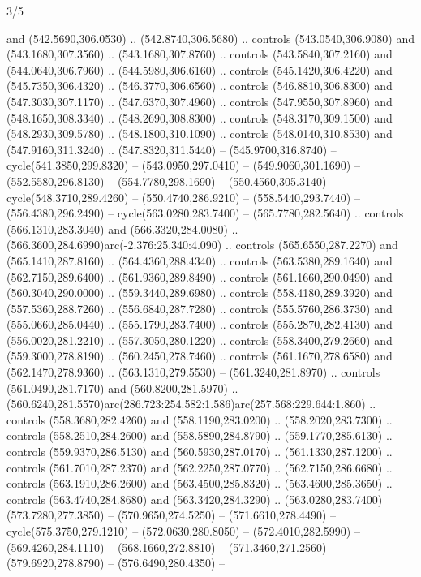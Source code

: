 \begin{flagdescription}{3/5}
\begin{scope}[xshift=0.5\flaglength,yshift=0.5\flagwidth,scale=\flagwidth/602.3]
\begin{scope}[y=0.8pt, x=0.8pt, yscale=-1, shift={(-600,-330)}]
  and (542.5690,306.0530) .. (542.8740,306.5680) .. controls (543.0540,306.9080)
  and (543.1680,307.3560) .. (543.1680,307.8760) .. controls (543.5840,307.2160)
  and (544.0640,306.7960) .. (544.5980,306.6160) .. controls (545.1420,306.4220)
  and (545.7350,306.4320) .. (546.3770,306.6560) .. controls (546.8810,306.8300)
  and (547.3030,307.1170) .. (547.6370,307.4960) .. controls (547.9550,307.8960)
  and (548.1650,308.3340) .. (548.2690,308.8300) .. controls (548.3170,309.1500)
  and (548.2930,309.5780) .. (548.1800,310.1090) .. controls (548.0140,310.8530)
  and (547.9160,311.3240) .. (547.8320,311.5440) -- (545.9700,316.8740) --
  cycle(541.3850,299.8320) -- (543.0950,297.0410) -- (549.9060,301.1690) --
  (552.5580,296.8130) -- (554.7780,298.1690) -- (550.4560,305.3140) --
  cycle(548.3710,289.4260) -- (550.4740,286.9210) -- (558.5440,293.7440) --
  (556.4380,296.2490) -- cycle(563.0280,283.7400) -- (565.7780,282.5640) ..
  controls (566.1310,283.3040) and (566.3320,284.0080) ..
  (566.3600,284.6990)arc(-2.376:25.340:4.090) .. controls (565.6550,287.2270)
  and (565.1410,287.8160) .. (564.4360,288.4340) .. controls (563.5380,289.1640)
  and (562.7150,289.6400) .. (561.9360,289.8490) .. controls (561.1660,290.0490)
  and (560.3040,290.0000) .. (559.3440,289.6980) .. controls (558.4180,289.3920)
  and (557.5360,288.7260) .. (556.6840,287.7280) .. controls (555.5760,286.3730)
  and (555.0660,285.0440) .. (555.1790,283.7400) .. controls (555.2870,282.4130)
  and (556.0020,281.2210) .. (557.3050,280.1220) .. controls (558.3400,279.2660)
  and (559.3000,278.8190) .. (560.2450,278.7460) .. controls (561.1670,278.6580)
  and (562.1470,278.9360) .. (563.1310,279.5530) -- (561.3240,281.8970) ..
  controls (561.0490,281.7170) and (560.8200,281.5970) ..
  (560.6240,281.5570)arc(286.723:254.582:1.586)arc(257.568:229.644:1.860) ..
  controls (558.3680,282.4260) and (558.1190,283.0200) .. (558.2020,283.7300) ..
  controls (558.2510,284.2600) and (558.5890,284.8790) .. (559.1770,285.6130) ..
  controls (559.9370,286.5130) and (560.5930,287.0170) .. (561.1330,287.1200) ..
  controls (561.7010,287.2370) and (562.2250,287.0770) .. (562.7150,286.6680) ..
  controls (563.1910,286.2600) and (563.4500,285.8320) .. (563.4600,285.3650) ..
  controls (563.4740,284.8680) and (563.3420,284.3290) ..
  (563.0280,283.7400)(573.7280,277.3850) -- (570.9650,274.5250) --
  (571.6610,278.4490) -- cycle(575.3750,279.1210) -- (572.0630,280.8050) --
  (572.4010,282.5990) -- (569.4260,284.1110) -- (568.1660,272.8810) --
  (571.3460,271.2560) -- (579.6920,278.8790) -- (576.6490,280.4350) --

\end{scope}
\end{scope}
\end{flagdescription}
